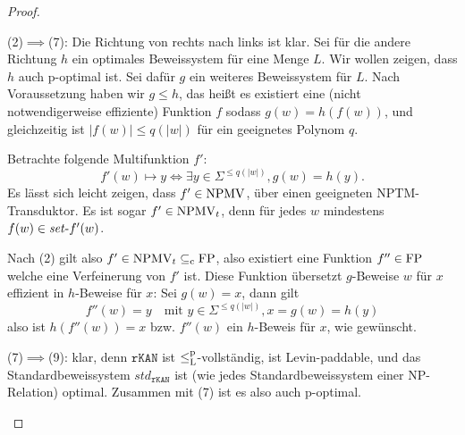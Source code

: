 \begin{proof}
\begin{prooflist}
\item (2)$\implies$(7): Die Richtung von rechts nach links ist klar. Sei für die andere Richtung $h$ ein optimales Beweissystem für eine Menge $L$. Wir wollen zeigen, dass $h$ auch p-optimal ist. Sei dafür $g$ ein weiteres Beweissystem für $L$. Nach Voraussetzung haben wir $g\leq h$, das heißt es existiert eine (nicht notwendigerweise effiziente) Funktion $f$ sodass $g(w)=h(f(w))$, und gleichzeitig ist $|f(w)|\leq q(|w|)$ für ein geeignetes Polynom $q$.

Betrachte folgende Multifunktion $f'$:
\[ f'(w) \mapsto y \iff \exists y\in\Sigma^{\leq q(|w|)}, g(w)=h(y). \]
Es lässt sich leicht zeigen, dass $f'\in\mathrm{NPMV}$, über einen geeigneten NPTM-Transduktor. 
Es ist sogar $f'\in\mathrm{NPMV}_t$, denn für jedes $w$ mindestens $f(w)\in \mathit{set}\text{-}{}f'(w)$.

Nach (2) gilt also $f'\in\mathrm{NPMV}_t\subseteq_\mathrm{c} \mathrm{FP}$, also existiert eine Funktion $f''\in\mathrm{FP}$ welche eine Verfeinerung von $f'$ ist. Diese Funktion übersetzt $g$-Beweise $w$ für $x$ effizient in $h$-Beweise für $x$: 
Sei $g(w)=x$, dann gilt
\[ f''(w) = y \quad\text{mit } y\in\Sigma^{\leq q(|w|)}, x=g(w)=h(y) \]
also ist $h(f''(w))=x$ bzw. $f''(w)$ ein $h$-Beweis für $x$, wie gewünscht.


\item (7)$\implies$(9): klar, denn $\mathtt{rKAN}$ ist $\leq_\mathrm{L}^\mathrm{p}$-vollständig, ist Levin-paddable, und das Standardbeweissystem $\mathit{std}_\mathtt{rKAN}$ ist (wie jedes Standardbeweissystem einer NP-Relation) optimal. Zusammen mit (7) ist es also auch p-optimal.
\end{prooflist}
\end{proof}

